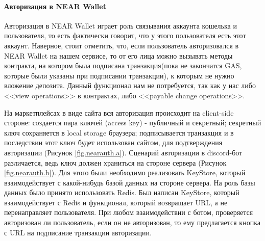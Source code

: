 \paragraph{Авторизация в NEAR Wallet}

Авторизация в NEAR Wallet играет роль связывания аккаунта кошелька и пользователя, то есть фактически говорит, что у этого пользователя есть этот аккаунт. Наверное, стоит отметить, что, если пользователь авторизовался в NEAR Wallet на нашем сервисе, то от его лица можно вызывать методы контракта, на котором была подписана транзакция(пока не закончатся GAS, которые были указаны при подписании транзакции), к которым не нужно вложение депозита. Данный функционал нам не потребуется, так как у нас либо <<view operations>> в контрактах, либо <<payable change operations>>.

На маркетплейсах в виде сайта вся авторизация происходит на client-side стороне: создается пара ключей (access key) - публичный и секретный; секретный ключ сохраняется в local storage браузера; подписывается транзакция и в последствии этот ключ будет использован сайтом, для подтверждения авторизации (Рисунок {\color{blue} \ref{fig.nearauth.a}}). Сценарий авторизации в discord-бот различается, ведь ключ должен храниться на стороне сервера (Рисунок {\color{blue} \ref{fig.nearauth.b}}). Для этого были необходимо реализовать KeyStore, который взаимодействует с какой-нибудь базой данных на стороне сервера. На роль базы данных было принято использовать Redis. Был написан KeyStore, который взаимодействует с Redis и функционал, который возвращает URL, а не перенаправляет пользователя. При любом взаимодействии с ботом, проверяется авторизован ли пользователь, если он не авторизован, то ему предлагается кнопка с URL на подписание транзакции авторизации.


